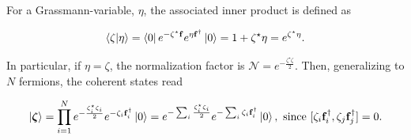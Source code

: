 \documentclass{homework}
\begin{document}

For a Grassmann-variable, $\eta$, the associated inner product is defined as 

\begin{equation}\begin{split}
    \bra{\zeta} \ket{\eta} = \bra{0} e^{-\zeta^\star {\bf f}} e^{{\eta} {\bf f}^\dagger}\ket{0} = 1 + \zeta^\star\eta = e^{\zeta^\star\eta}.
\end{split}
\end{equation}
    
In particular, if $\eta = \zeta$, the normalization factor is $\mathcal{N} = e^{-\frac{\zeta^\star\zeta}{2}}$. Then, generalizing to $N$ fermions, the coherent states read

$$
    \ket{{\bm \zeta}} = \prod_{i=1}^{N} e^{-\frac{\zeta^\star_i\zeta_i}{2}} e^{-\zeta_i {\bf f}_i^\dagger} \ket{0} = e^{-\sum_{i} \frac{\zeta^\star_i\zeta_i}{2}} e^{-\sum_{i} \zeta_i {\bf f}_i^\dagger} \ket{0}, \textnormal{ since } [\zeta_i {\bf f}_i^\dagger, \zeta_j {\bf f}_j^\dagger] = 0.
$$
\end{document}
